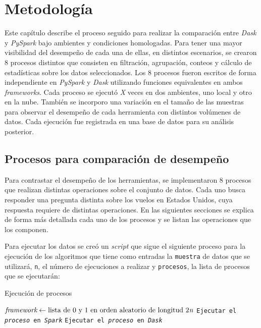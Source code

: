 \chapter{Metodología}

\noindent Este capítulo describe el proceso seguido para realizar la comparación entre \textit{Dask} y \textit{PySpark} bajo ambientes y condiciones homologadas. Para tener una mayor visibilidad del desempeño de cada una de ellas, en distintos escenarios, se crearon 8 procesos distintos que consisten en filtración, agrupación, conteos y cálculo de estadísticas sobre los datos seleccionados. Los 8 procesos fueron escritos de forma independiente en \textit{PySpark} y \textit{Dask} utilizando funciones equivalentes en ambos \textit{frameworks}. Cada proceso se ejecutó \textit{\LARGE X} veces en dos ambientes, uno local y otro en la nube. También se incorporo una variación en el tamaño de las muestras para observar el desempeño de cada herramienta con distintos volúmenes de datos. Cada ejecución fue registrada en una base de datos para su análisis posterior. 
\newpage

\section{Procesos para comparación de desempeño}

Para contrastar el desempeño de los herramientas, se implementaron 8 procesos que realizan distintas operaciones sobre el conjunto de datos. Cada uno busca responder una pregunta distinta sobre los vuelos en Estados Unidos, cuya respuesta requiere de distintas operaciones. En las siguientes secciones se explica de forma más detallada cada uno de los procesos y se listan las operaciones que los componen.

Para ejecutar los datos se creó un \textit{script} que sigue el siguiente proceso para la ejecución de los algoritmos que tiene como entradas la \texttt{muestra} de datos que se utilizará, \texttt{n}, el número de ejecuciones a realizar y \texttt{procesos}, la lista de procesos que se ejecutarán:

\begin{algorithm}[H]
\caption{Ejecución de procesos}\label{ejecucion_procesos}
\begin{algorithmic}[1]
	\State $\textit{framework} \gets \text{lista de 0 y 1 en orden aleatorio de longitud 2\textit{n}}$
		\State \texttt{Ejecutar el \textit{proceso} en \textit{Spark}}
		\Else
		\State \texttt{Ejecutar el \textit{proceso} en \textit{Dask}}
		\EndIf
	\EndFor
\EndFor
\EndProcedure
\end{algorithmic}
\end{algorithm}

